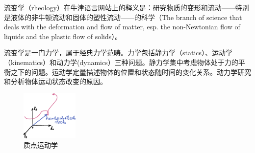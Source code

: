 \documentclass[main.tex]{subfiles}
\begin{document}
流变学（rheology）在牛津语言网站上的释义是：研究物质的变形和流动——特别是液体的非牛顿流动和固体的塑性流动——的科学（The branch of science that deals with the deformation and flow of matter, esp. the non-Newtonian flow of liquids and the plastic flow of solids）。

流变学是一门力学，属于经典力学范畴。力学包括静力学（statics）、运动学（kinematics）和动力学(dynamics）三种问题。静力学集中考虑物体处于力的平衡之下的问题。运动学定量描述物体的位置和状态随时间的变化关系。动力学研究和分析物体运动状态改变的原因。\cite[p.~1]{邓文基2009大物上}

\begin{figure}
\centering
\includegraphics[width=0.25\textwidth]{images/I.1.1.eps}
\caption{质点运动学}
\label{fig:I.1.1}
\end{figure}
\end{document}
